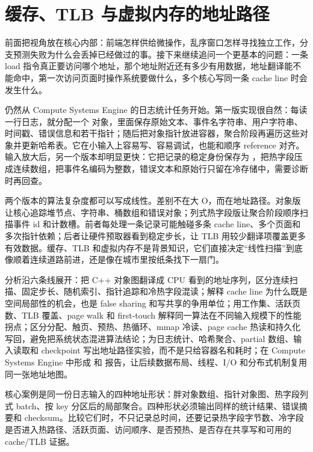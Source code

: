 \chapter{缓存、TLB 与虚拟内存的地址路径}

前面把视角放在核心内部：前端怎样供给微操作，乱序窗口怎样寻找独立工作，分支预测失败为什么会丢掉已经做过的事。接下来继续追问一个更基本的问题：一条 load 指令真正要访问哪个地址，那个地址附近还有多少有用数据，地址翻译能不能命中，第一次访问页面时操作系统要做什么，多个核心写同一条 cache line 时会发生什么。

仍然从 Compute Systems Engine 的日志统计任务开始。第一版实现很自然：每读一行日志，就分配一个  对象，里面保存原始文本、事件名字符串、用户字符串、时间戳、错误信息和若干指针；随后把对象指针放进容器，聚合阶段再遍历这些对象并更新哈希表。它在小输入上容易写、容易调试，也能和顺序 reference 对齐。输入放大后，另一个版本却明显更快：它把记录的稳定身份保存为 ，把热字段压成连续数组，把事件名编码为整数，错误文本和原始行只留在冷存储中，需要诊断时再回查。

两个版本的算法复杂度都可以写成线性。差别不在大 O，而在地址路径。对象版让核心追踪堆节点、字符串、桶数组和错误对象；列式热字段版让聚合阶段顺序扫描事件 id 和计数槽。前者每处理一条记录可能触碰多条 cache line、多个页面和多次指针依赖；后者让硬件预取器看到稳定步长，让 TLB 用较少翻译项覆盖更多有效数据。缓存、TLB 和虚拟内存不是背景知识，它们直接决定“线性扫描”到底像顺着连续道路前进，还是像在城市里按纸条找下一扇门。

分析沿六条线展开：把 C++ 对象图翻译成 CPU 看到的地址序列，区分连续扫描、固定步长、随机索引、指针追踪和冷热字段混读；解释 cache line 为什么既是空间局部性的机会，也是 false sharing 和写共享的争用单位；用工作集、活跃页数、TLB 覆盖、page walk 和 first-touch 解释同一算法在不同输入规模下的性能拐点；区分分配、触页、预热、热循环、mmap 冷读、page cache 热读和持久化写回，避免把系统状态混进算法结论；为日志统计、哈希聚合、partial 数组、输入读取和 checkpoint 写出地址路径实验，而不是只给容器名和耗时；在 Compute Systems Engine 中形成  和  报告，让后续数据布局、线程、I/O 和分布式机制复用同一张地址地图。

\begin{casebox}
核心案例是同一份日志输入的四种地址形状：胖对象数组、指针对象图、热字段列式 batch、按 key 分区后的局部聚合。四种形状必须输出同样的统计结果、错误摘要和 checksum。比较它们时，不只记录总时间，还要记录热字段字节数、冷字段是否进入热路径、活跃页面、访问顺序、是否预热、是否存在共享写和可用的 cache/TLB 证据。
\end{casebox}

